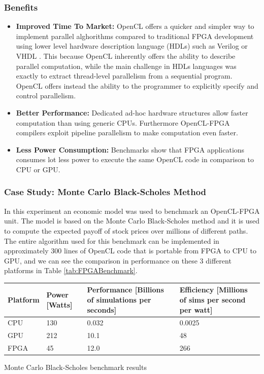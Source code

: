 \subsubsection{Benefits}

\begin{itemize}
	\item \textbf{Improved Time To Market:} OpenCL offers a quicker and simpler way to implement parallel alghorithms  compared to traditional FPGA development using lower level hardware description language (HDLs) such as Verilog or VHDL \cite {altera:FPGA}.  This because OpenCL inherently offers the ability to describe parallel computation, while the main challenge in HDLs languages was exactly to extract thread-level parallelism from a sequential program. OpenCL offers instead the ability to the programmer to explicitly specify and control parallelism.
	\item \textbf{Better Performance:} Dedicated ad-hoc hardware structures allow faster computation than using generic CPUs. Furthermore OpenCL-FPGA compilers exploit pipeline parallelism to make computation even faster.
	\item \textbf{Less Power Consumption:} Benchmarks show that FPGA applications consumes lot less power to execute the same OpenCL code in comparison to CPU or GPU.
\end{itemize}

\subsubsection{Case Study: Monte Carlo Black-Scholes Method}

In this experiment an economic model was used to benchmark an OpenCL-FPGA unit. The model is based on the 
Monte Carlo Black-Scholes method and it is used to compute the expected payoff of stock prices over millions of different paths. The entire algorithm used for this benchmark can be implemented in approximately 300 lines of
OpenCL code that is portable from FPGA to CPU to GPU, and we can see the comparison in performance on these 3 different platforms in Table \ref{tab:FPGABenchmark}.

\begin{tablehere}
{\footnotesize
\begin{tabular}{|p{}|p{}|p{}|p{}|}\hline
\textbf{Platform} & \textbf{Power} [Watts] & \textbf{Performance} [Billions of simulations per seconds] & \textbf{Efficiency} [Millions of sims per second per watt]\\ \hline
CPU & 130 & 0.032 & 0.0025 \\ \hline
GPU & 212 & 10.1 & 48 \\ \hline
FPGA & 45 & 12.0 & 266 \\ \hline
\end{tabular}}
  \caption{Monte Carlo Black-Scholes benchmark results\\}
	\label{tab:FPGABenchmark}
\end{tablehere}

